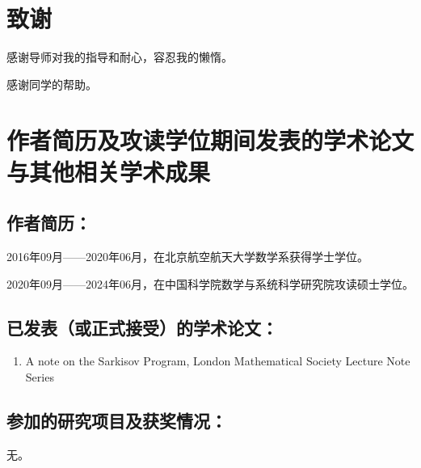 \chapter[致谢]{致\quad 谢}%

感谢导师对我的指导和耐心，容忍我的懒惰。

感谢同学的帮助。

\chapter{作者简历及攻读学位期间发表的学术论文与其他相关学术成果}

\section*{作者简历：}
2016年09月——2020年06月，在北京航空航天大学数学系获得学士学位。


2020年09月——2024年06月，在中国科学院数学与系统科学研究院攻读硕士学位。


\section*{已发表（或正式接受）的学术论文：}

{
\setlist[enumerate]{}%
\begin{enumerate}[nosep]
    \item A note on the Sarkisov Program, London Mathematical Society Lecture Note Series
\end{enumerate}
}


\section*{参加的研究项目及获奖情况：}
无。


\cleardoublepage[plain]%
